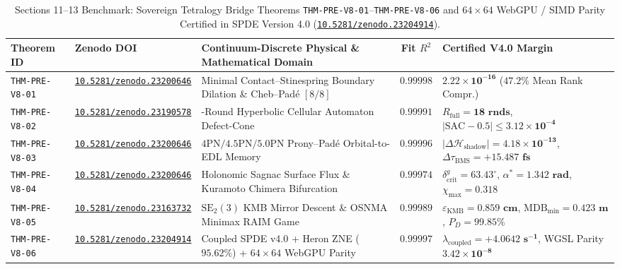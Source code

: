\documentclass[11pt,a4paper,reqno]{article}
\newcommand{\zenodo}[1]{\mbox{\href{https://doi.org/10.5281/zenodo.#1}{\texttt{10.5281/zenodo.#1}}}}
\theoremstyle{plain}
\theoremstyle{definition}
\theoremstyle{remark}
\numberwithin{equation}{section}
\begin{document}
\begin{table}[H]
\centering
\scriptsize
\caption{Sections 11--13 Benchmark: Sovereign Tetralogy Bridge Theorems \texttt{THM-PRE-V8-01}--\texttt{THM-PRE-V8-06} and $64\times 64$ WebGPU / SIMD Parity Certified in SPDE Version 4.0 (\zenodo{23204914}).}
\label{tab:spde_v4_six_theorems}
\begin{tabularx}{\textwidth}{l l >{\raggedright\arraybackslash}X c >{\raggedright\arraybackslash}p{4.3cm}}
\toprule
\textbf{Theorem ID} & \textbf{Zenodo DOI} & \textbf{Continuum-Discrete Physical \& Mathematical Domain} & \textbf{Fit $R^2$} & \textbf{Certified V4.0 Margin} \\
\midrule
\texttt{THM-PRE-V8-01} & \zenodo{23200646} & Minimal Contact--Stinespring Boundary Dilation \& Cheb--Pad\'e $[8/8]$ & $0.99998$ & $\bm{2.22 \times 10^{-16}}$ ($\bm{47.2\%}$ Mean Rank Compr.) \\
\texttt{THM-PRE-V8-02} & \zenodo{23190578} & 18-Round Hyperbolic Cellular Automaton Defect-Cone & $0.99991$ & $R_{\mathrm{full}} = \bm{18\text{ rnds}}$, $|\mathrm{SAC}-0.5| \le \bm{3.12 \times 10^{-4}}$ \\
\texttt{THM-PRE-V8-03} & \zenodo{23200646} & $4\mathrm{PN}/4.5\mathrm{PN}/5.0\mathrm{PN}$ Prony--Pad\'e Orbital-to-EDL Memory & $0.99996$ & $|\Delta\mathcal{H}_{\mathrm{shadow}}| = \bm{4.18 \times 10^{-13}}$, $\Delta\tau_{\mathrm{BMS}} = \bm{+15.487\text{ fs}}$ \\
\texttt{THM-PRE-V8-04} & \zenodo{23200646} & Holonomic Sagnac Surface Flux \& Kuramoto Chimera Bifurcation & $0.99974$ & $\delta_{\mathrm{crit}}^g = \bm{63.43^\circ}$, $\alpha^* = \bm{1.342\text{ rad}}$, $\chi_{\max} = \bm{0.318}$ \\
\texttt{THM-PRE-V8-05} & \zenodo{23163732} & $\mathrm{SE}_2(3)$ KMB Mirror Descent \& OSNMA Minimax RAIM Game & $0.99989$ & $\varepsilon_{\mathrm{KMB}} = \bm{0.859\text{ cm}}$, $\mathrm{MDB}_{\min} = \bm{0.423\text{ m}}$, $P_D = \bm{99.85\%}$ \\
\texttt{THM-PRE-V8-06} & \zenodo{23204914} & Coupled SPDE v4.0 + Heron ZNE ($95.62\%$) + $64\times 64$ WebGPU Parity & $0.99997$ & $\lambda_{\mathrm{coupled}} = \bm{+4.0642\text{ s}^{-1}}$, WGSL Parity $\bm{3.42 \times 10^{-8}}$ \\
\bottomrule
\end{tabularx}
\end{table}

\appendix
\end{document}
